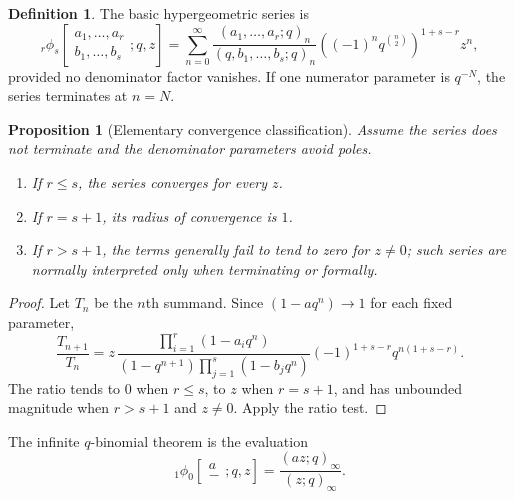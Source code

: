 \documentclass[11pt,a4paper,oneside,openany]{book}
\newtheorem{proposition}[proposition]{Proposition}
\theoremstyle{definition}
\newtheorem{definition}[definition]{Definition}
\theoremstyle{remark}
\begin{document}
\begin{definition}\label{qg:def-basic-hypergeometric-series}
The basic hypergeometric series is
\[
 {}_r\phi_s\!\left[
 \begin{matrix}a_1,\dots,a_r\\ b_1,\dots,b_s\end{matrix};q,z\right]
 =\sum_{n=0}^{\infty}
 \frac{(a_1,\dots,a_r;q)_n}{(q,b_1,\dots,b_s;q)_n}
 \left((-1)^nq^{\binom n2}\right)^{1+s-r}z^n,
\]
provided no denominator factor vanishes.  If one numerator parameter is $q^{-N}$, the series terminates at $n=N$.
\end{definition}

\begin{proposition}[Elementary convergence classification]\label{prop:phi-convergence}
Assume the series does not terminate and the denominator parameters avoid poles.
\begin{enumerate}[label=\textup{(\roman*)}]
\item If $r\le s$, the series converges for every $z$.
\item If $r=s+1$, its radius of convergence is $1$.
\item If $r>s+1$, the terms generally fail to tend to zero for $z\ne0$; such series are normally interpreted only when terminating or formally.
\end{enumerate}
\end{proposition}

\begin{proof}
Let $T_n$ be the $n$th summand.  Since $(1-aq^n)\to1$ for each fixed parameter,
\[
 \frac{T_{n+1}}{T_n}
 =z\,\frac{\prod_{i=1}^{r}(1-a_iq^n)}
 {(1-q^{n+1})\prod_{j=1}^{s}(1-b_jq^n)}
 (-1)^{1+s-r}q^{n(1+s-r)}.
\]
The ratio tends to $0$ when $r\le s$, to $z$ when $r=s+1$, and has unbounded magnitude when $r>s+1$ and $z\ne0$.  Apply the ratio test.
\end{proof}

The infinite $q$-binomial theorem is the evaluation
\[
 {}_1\phi_0\!\left[\begin{matrix}a\\-\end{matrix};q,z\right]
 =\frac{(az;q)_\infty}{(z;q)_\infty}.
\]

\end{document}
